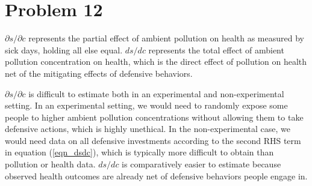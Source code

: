 \documentclass[12pt]{article}
\begin{document}
\section*{Problem 12}
$\partial s/\partial c$ represents the partial effect of ambient pollution on health as measured by sick days, holding all else equal. $d s/ dc$ represents the total effect of ambient pollution concentration on health, which is the direct effect of pollution on health net of the mitigating effects of defensive behaviors.

 $\partial s / \partial c$ is difficult to estimate both in an experimental and non-experimental setting. In an experimental setting, we would need to randomly expose some people to higher ambient pollution concentrations without allowing them to take defensive actions, which is highly unethical. In the non-experimental case, we would need data on all defensive investments according to the second RHS term in equation (\ref{eqn_dsdc}), which is typically more difficult to obtain than pollution or health data. $ds / dc$ is comparatively easier to estimate because observed health outcomes are already net of defensive behaviors people engage in.
\end{document}
